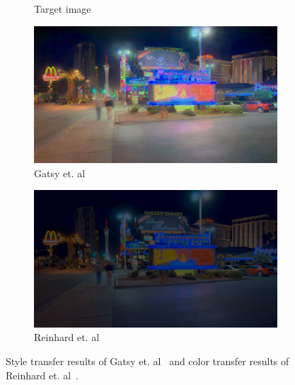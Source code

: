 {\begin{landscape}
\begin{figure}
\begin{subfigure}[b]{0.41\textwidth}
    \caption{Target image}
\end{subfigure}\hfill
\begin{subfigure}[b]{0.41\textwidth}
    \centering
    \includegraphics[width=\textwidth]{figures/neuro_style_transfer/Peppermill_0.1_10000.0_candy.png}
    \caption{Gatsy et. al~\cite{gatys2016image}}
    \label{fig:neuro_style_result_2}
\end{subfigure}\hfill
\begin{subfigure}[b]{0.41\textwidth}
    \centering
    \includegraphics[width=\textwidth]{figures/reinhard_color_transfer/Peppermill_Frontier_candy.png}
    \caption{Reinhard et. al~\cite{reinhard2001color}}
    \label{fig:reinhard_color_result_2}
\end{subfigure}\hfill
\caption{Style transfer results of Gatsy et. al~\cite{gatys2016image} and color transfer results of Reinhard et. al~\cite{reinhard2001color}.}
\label{fig:neural_style_transfer}
\end{figure}
\end{landscape}}

